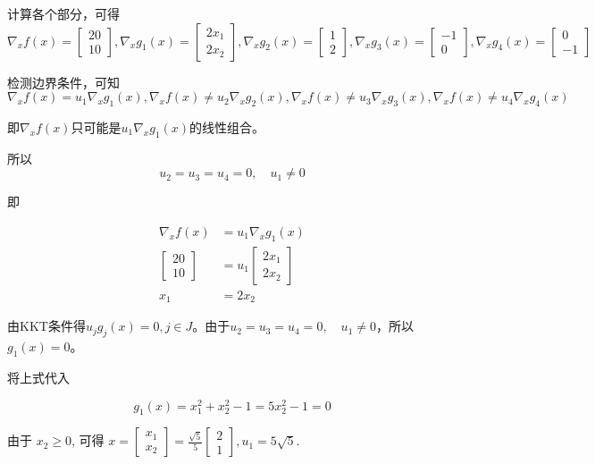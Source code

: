 计算各个部分，可得
$$ \nabla_{x} f(x)=\left[\begin{array}{c}20 \\ 10\end{array}\right], \nabla_{x} g_{1}(x)=\left[\begin{array}{c}2 x_{1} \\ 2 x_{2}\end{array}\right], \nabla_{x} g_{2}(x)=\left[\begin{array}{l}1 \\ 2\end{array}\right], \nabla_{x} g_{3}(x)=\left[\begin{array}{l}-1 \\ 0\end{array}\right], \nabla_{x} g_{4}(x)=\left[\begin{array}{l}0 \\ -1\end{array}\right]$$

检测边界条件，可知
$$ \nabla_{x} f(x)=u_{1} \nabla_{x} g_{1}(x), \nabla_{x} f(x) \neq u_{2} \nabla_{x} g_{2}(x), \nabla_{x} f(x) \neq u_{3} \nabla_{x} g_{3}(x), \nabla_{x} f(x) \neq u_{4} \nabla_{x} g_{4}(x) $$

即$\nabla_{x} f(x)$只可能是$u_{1} \nabla_{x} g_{1}(x)$的线性组合。

所以
$$ u_{2}=u_{3}=u_{4}=0, \quad u_{1} \neq 0 $$

即

$$
\begin{aligned}
    \nabla_{x} f(x)&=u_{1} \nabla_{x} g_{1}(x)\\
\left[\begin{array}{c}
20 \\
10
\end{array}\right]&=u_{1}\left[\begin{array}{c}
2 x_{1} \\
2 x_{2}
\end{array}\right]\\
x_{1}&=2 x_{2} 
\end{aligned}
$$

由KKT条件得$ u_{j} g_{j}(x)=0, j \in J $。由于$ u_{2}=u_{3}=u_{4}=0, \quad u_{1} \neq 0 $，所以$g_1(x) = 0$。


将上式代入

$$g_{1}(x)=x_{1}^{2}+x_{2}^{2}-1=5 x_{2}^{2}-1=0$$


由于 $ x_{2} \geq 0 $, 可得 $x = \left[\begin{array}{l}x_{1} \\ x_{2}\end{array}\right]=\frac{\sqrt{5}}{5}\left[\begin{array}{l}2 \\ 1\end{array}\right], u_{1}=5 \sqrt{5} $.

